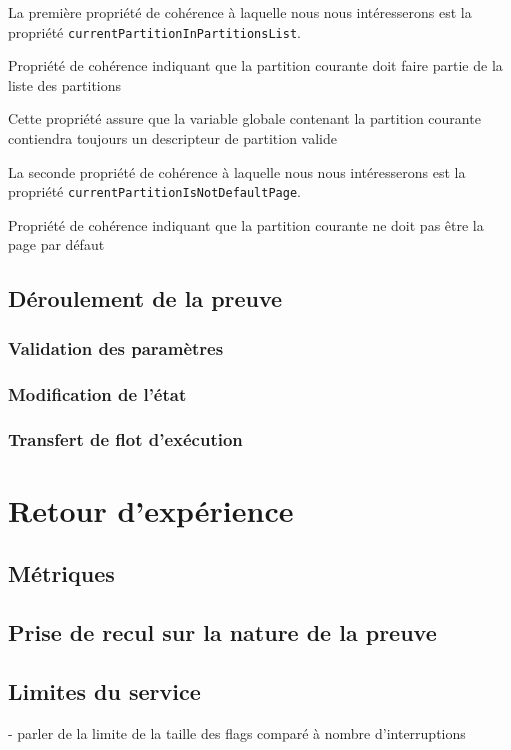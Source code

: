 			La première propriété de cohérence à laquelle nous nous intéresserons est la propriété \texttt{currentPartitionInPartitionsList}.

			\begin{listing}[!ht]
				\caption{Propriété de cohérence indiquant que la partition courante doit faire partie de la liste des partitions}
				\label{code:currentPartitionInPartitionsList}
			\end{listing}

			Cette propriété assure que la variable globale contenant la partition courante contiendra toujours un descripteur de partition valide

			La seconde propriété de cohérence à laquelle nous nous intéresserons est la propriété \texttt{currentPartitionIsNotDefaultPage}.

			\begin{listing}[!ht]
				\caption{Propriété de cohérence indiquant que la partition courante ne doit pas être la page par défaut}
				\label{code:currentPartitionIsNotDefaultPage}
			\end{listing}
		
			
		\subsection{Déroulement de la preuve}
			\subsubsection{Validation des paramètres}
			\subsubsection{Modification de l'état}
			\subsubsection{Transfert de flot d'exécution}

	\section{Retour d'expérience}
		\subsection{Métriques}
		\subsection{Prise de recul sur la nature de la preuve}
		\subsection{Limites du service}
			- parler de la limite de la taille des flags comparé à nombre d'interruptions
